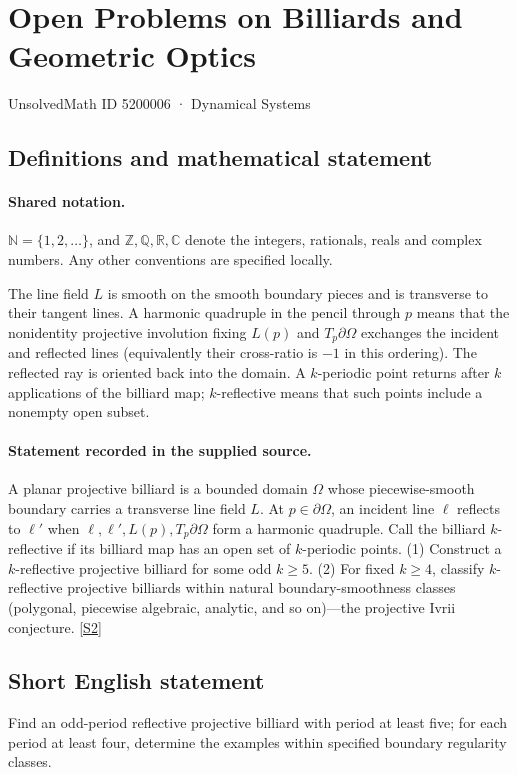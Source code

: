 \documentclass[11pt]{article}
\newcommand{\sref}[2]{\hyperlink{source:#1:#2}{[S#2]}}
\begin{document}
\setcounter{section}{5200005}
\section{Open Problems on Billiards and Geometric Optics}\label{5200006}
{\small\sffamily UnsolvedMath ID 5200006 · Dynamical Systems}
\subsection{Definitions and mathematical statement}

\paragraph{Shared notation.}$\mathbb N=\{1,2,\ldots\}$, and $\mathbb Z,\mathbb Q,\mathbb R,\mathbb C$ denote the integers, rationals, reals and complex numbers. Any other conventions are specified locally.


The line field $L$ is smooth on the smooth boundary pieces and is transverse to their tangent lines. A harmonic quadruple in the pencil through $p$ means that the nonidentity projective involution fixing $L(p)$ and $T_p\partial\Omega$ exchanges the incident and reflected lines (equivalently their cross-ratio is $-1$ in this ordering). The reflected ray is oriented back into the domain. A $k$-periodic point returns after $k$ applications of the billiard map; $k$-reflective means that such points include a nonempty open subset.
\paragraph{Statement recorded in the supplied source.}
A planar projective billiard is a bounded domain $\Omega$ whose piecewise-smooth boundary carries a transverse line field $L$. At $p\in\partial\Omega$, an incident line $\ell$ reflects to $\ell'$ when $\ell,\ell',L(p),T_p\partial\Omega$ form a harmonic quadruple. Call the billiard $k$-reflective if its billiard map has an open set of $k$-periodic points. (1) Construct a $k$-reflective projective billiard for some odd $k\ge5$. (2) For fixed $k\ge4$, classify $k$-reflective projective billiards within natural boundary-smoothness classes (polygonal, piecewise algebraic, analytic, and so on)—the projective Ivrii conjecture. \sref{5200006}{2}
\subsection{Short English statement}
Find an odd-period reflective projective billiard with period at least five; for each period at least four, determine the examples within specified boundary regularity classes.
\end{document}
